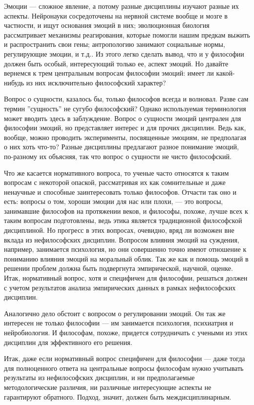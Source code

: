 \documentclass[11pt]{book}
\begin{document}
Эмоции --- сложное явление, а потому разные дисциплины изучают разные их аспекты. Нейронауки сосредоточены на нервной системе вообще и мозге в частности, и ищут основания эмоций в них; эволюционная биология рассматривает механизмы реагирования, которые помогли нашим предкам выжить и распространить свои гены; антропологию занимают социальные нормы, регулирующие эмоции, и т.д.. Из этого легко сделать вывод, что и у философии должен быть особый, интересующий только ее, аспект эмоций. Но давайте вернемся к трем центральным вопросам философии эмоций: имеет ли какой-нибудь из них исключительно философский характер?

Вопрос о сущности, казалось бы, только философов всегда и волновал. Разве сам термин ''сущность'' не сугубо философский? Однако используемая терминология может вводить здесь в заблуждение. Вопрос о сущности эмоций централен для философии эмоций, но представляет интерес и для прочих дисциплин. Ведь как, вообще, можно проводить эксперименты, посвященные эмоциям, не предполагая о них хоть что-то? Разные дисциплины предлагают разное понимание эмоций, по-разному их объясняя, так что вопрос о сущности не чисто философский.

Что же касается нормативного вопроса, то ученые часто относятся к таким вопросам с некоторой опаской, рассматривая их как сомнительные и даже ненаучные и способные заинтересовать только философов. Отчасти так оно и есть: вопросы о том, хороши эмоции для нас или плохи, --- это вопросы, занимавшие философов на протяжении веков, и философы, похоже, лучше всех к таким вопросам подготовлены, ведь этика является традиционной философской дисциплиной. Но прогресс в этих вопросах, очевидно, вряд ли возможен вне вклада из нефилософских дисциплин. Вопросом влияния эмоций на суждения, например, занимается психология, но они совершенно точно имеют отношение к пониманию влияния эмоций на моральный облик. Так же как и помощь эмоций в решении проблем должна быть подвергнута эмпирической, научной, оценке. Итак, нормативный вопрос, хотя и специфичен для философии, решаться должен с учетом результатов анализа эмпирических данных в рамках нефилософских дисциплин.

Аналогично дело обстоит с вопросом о регулировании эмоций. Он так же интересен не только философии --- им занимается психология, психиатрия и нейробиология. И философам, похоже, придется сотрудничать с учеными из этих дисциплин для эффективного его решения.

Итак, даже если нормативный вопрос специфичен для философии --- даже тогда для полноценного ответа на центральные вопросы философам нужно учитывать результаты из нефилософских дисциплин, и ни предполагаемые методологические различия, ни различные интересующие аспекты не гарантируют обратного. Подход, значит, должен быть междисциплинарным.
\end{document}
